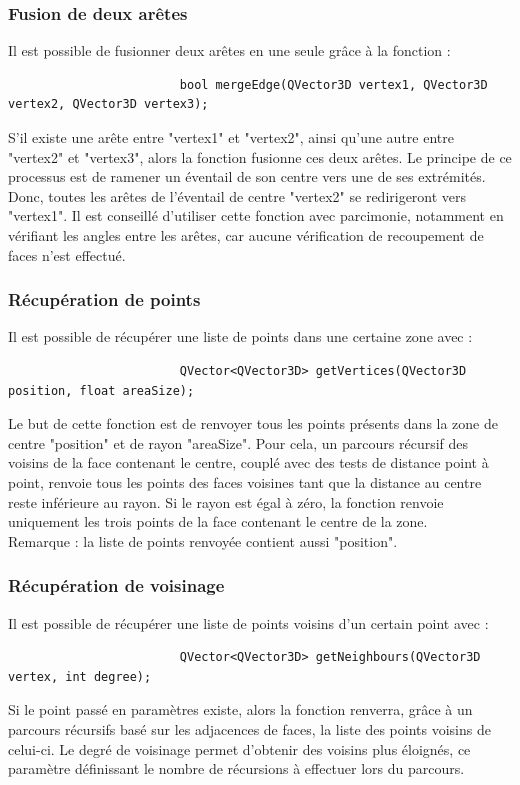 \documentclass[a4paper]{memoir}
\begin{document}
				\subsubsection{Fusion de deux arêtes}
					Il est possible de fusionner deux arêtes en une seule grâce à la fonction :
					\begin{verbatim}
						bool mergeEdge(QVector3D vertex1, QVector3D vertex2, QVector3D vertex3);
					\end{verbatim}
					S'il existe une arête entre "vertex1" et "vertex2", ainsi qu'une autre entre "vertex2" et "vertex3", alors la fonction fusionne ces deux 
					arêtes. Le principe de ce processus est de ramener un éventail de son centre vers une de ses extrémités. Donc, toutes les arêtes de 
					l'éventail de centre "vertex2" se redirigeront vers "vertex1". Il est conseillé d'utiliser cette fonction avec parcimonie, notamment en 
					vérifiant les angles entre les arêtes, car aucune vérification de recoupement de faces n'est effectué.
					
				\subsubsection{Récupération de points}
					Il est possible de récupérer une liste de points dans une certaine zone avec :
					\begin{verbatim}
						QVector<QVector3D> getVertices(QVector3D position, float areaSize);
					\end{verbatim}
					Le but de cette fonction est de renvoyer tous les points présents dans la zone de centre "position" et de rayon "areaSize". Pour cela, 
					un parcours récursif des voisins de la face contenant le centre, couplé avec des tests de distance point à point, renvoie tous les 
					points des faces voisines tant que la distance au centre reste inférieure au rayon. Si le rayon est égal à zéro, la fonction renvoie 
					uniquement les trois points de la face contenant le centre de la zone.\\ 
					Remarque : la liste de points renvoyée contient aussi "position".
					
				\subsubsection{Récupération de voisinage}
					Il est possible de récupérer une liste de points voisins d'un certain point avec :
					\begin{verbatim}
						QVector<QVector3D> getNeighbours(QVector3D vertex, int degree);
					\end{verbatim}
					Si le point passé en paramètres existe, alors la fonction renverra, grâce à un parcours récursifs basé sur les adjacences de faces, la 
					liste des points voisins de celui-ci. Le degré de voisinage permet d'obtenir des voisins plus éloignés, ce paramètre définissant le 
					nombre de récursions à effectuer lors du parcours.
					
\end{document}
